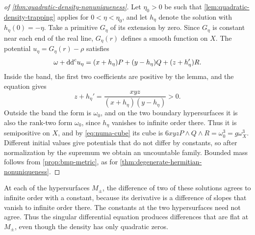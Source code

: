\begin{proof}[of \cref{thm:quadratic-density-nonuniqueness}]
Let $\eta_0>0$ be such that \cref{lem:quadratic-density-trapping} applies for $0<\eta<\eta_0$, and let $h_\eta$ denote the solution with $h_\eta(0)=-\eta$. Take a primitive $G_\eta$ of its extension by zero. Since $G_\eta$ is constant near each end of the real line, $G_\eta(r)$ defines a smooth function on $X$. The potential $u_\eta=G_\eta(r)-\rho$ satisfies
\[
 \omega+\mathrm{dd}^{\mathrm{c}} u_\eta
 =(x+h_\eta)P+(y-h_\eta)Q+(z+h_\eta')R.
\]
Inside the band, the first two coefficients are positive by the lemma, and the equation gives
\[
 z+h_\eta'=\frac{xyz}{(x+h_\eta)(y-h_\eta)}>0.
\]
Outside the band the form is $\omega_0$, and on the two boundary hypersurfaces it is also the rank-two form $\omega_0$, since $h_\eta$ vanishes to infinite order there. Thus it is semipositive on $X$, and by \eqref{eq:numa-cube} its cube is $6xyzP\wedge Q\wedge R=\omega_0^3=g\omega_X^3$. Different initial values give potentials that do not differ by constants, so after normalization by the supremum we obtain an uncountable family. Bounded mass follows from \cref{prop:bmp-metric}, as for \cref{thm:degenerate-hermitian-nonuniqueness}.
\end{proof}

At each of the hypersurfaces $M_\pm$, the difference of two of these solutions agrees to infinite order with a constant, because its derivative is a difference of slopes that vanish to infinite order there. The constants at the two hypersurfaces need not agree. Thus the singular differential equation produces differences that are flat at $M_\pm$, even though the density has only quadratic zeros.
